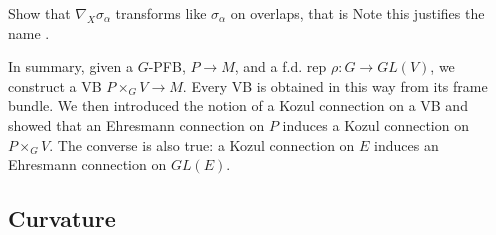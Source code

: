 \documentclass{article}
\begin{document}
\begin{ex}
	Show that $\nabla_X \sigma_\alpha$ transforms like $\sigma_ \alpha$ on overlaps, that is 
	Note this justifies the name . 
\end{ex}

In summary, given a $G$-PFB, $P \to M$, and a f.d. rep $\rho : G \to GL(V)$, we construct a VB $P\times_G V \to M$. Every VB is obtained in this way from its frame bundle. We then introduced the notion of a Kozul connection on a VB and showed that an Ehresmann connection on $P$ induces a Kozul connection on $P \times_G V$. The converse is also true: a Kozul connection on $E$ induces an Ehresmann connection on $GL(E)$. 

\subsection{Curvature}
\end{document}
